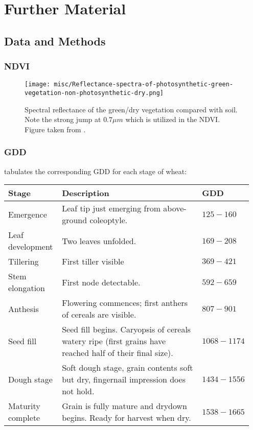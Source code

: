 \chapter{Further Material}

\section{Data and Methods}{
    \subsection{NDVI}
		\begin{figure}[H]
			\centering
			\texttt{[image: misc/Reflectance-spectra-of-photosynthetic-green-vegetation-non-photosynthetic-dry.png]}
			\vspace{0.15cm}
			\caption[Spectral reflectance of the green/dry vegetation]{Spectral reflectance of the green/dry vegetation compared with soil. Note the strong jump at $0.7\mu m$ which is utilized in the NDVI. Figure taken from \cite{verhoevenLookingBlackTintedGlasses2006}.}
			\label{fig:misc/Reflectance-spectra-of-photosynthetic-green-vegetation-non-photosynthetic-dry.png}
		\end{figure}
		\pagebreak
	\subsection{GDD}\label{app:gdd_examples}
		\cite{millerUsingGrowingDegree2018} tabulates the corresponding GDD for each stage of wheat:
		
			\begin{tabular}{p{0.22\linewidth} p{0.6\linewidth}  p{0.13\linewidth}} 
				\toprule
				Stage  & Description    & GDD \\
				\hline Emergence & Leaf tip just emerging from above-ground coleoptyle. & $125-160$ \\
				\hline Leaf development & Two leaves unfolded. & $169-208$ \\
				\hline Tillering & First tiller visible  & $369-421$ \\
				\hline Stem elongation & First node detectable. & $592-659$ \\
				\hline Anthesis & Flowering commences; first anthers of cereals are visible. & $807-901$ \\
				\hline Seed fill & Seed fill begins. Caryopsis of cereals watery ripe (first grains have reached half of their final size). & $1068-1174$ \\
				\hline Dough stage & Soft dough stage, grain contents soft but dry, fingernail impression does not hold. & $1434-1556$ \\
				\hline Maturity complete & Grain is fully mature and drydown begins. Ready for harvest when dry. & $1538-1665$ \\
				\bottomrule
			\end{tabular}
}


